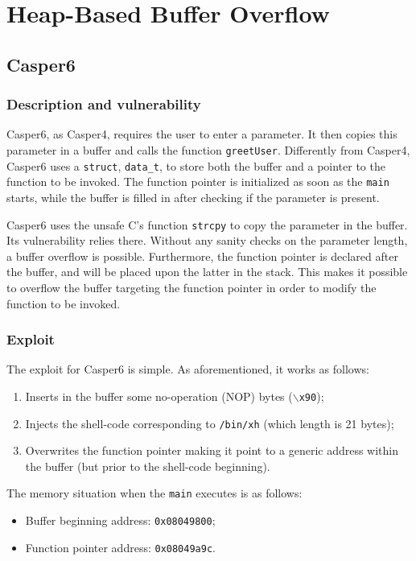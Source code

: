 \section{Heap-Based Buffer Overflow}
\subsection{Casper6}
\subsubsection{Description and vulnerability}
Casper6, as Casper4, requires the user to enter a parameter. It then copies this parameter in a buffer and calls the function \texttt{greetUser}. Differently from Casper4, Casper6 uses a \texttt{struct}, \texttt{data\_t}, to store both the buffer and a pointer to the function to be invoked. The function pointer is initialized as soon as the \texttt{main} starts, while the buffer is filled in after checking if the parameter is present. 

Casper6 uses the unsafe C's function \texttt{strcpy} to copy the parameter in the buffer. Its vulnerability relies there. Without any sanity checks on the parameter length, a buffer overflow is possible. Furthermore, the function pointer is declared after the buffer, and will be placed upon the latter in the stack. This makes it possible to overflow the buffer targeting the function pointer in order to modify the function to be invoked.

\subsubsection{Exploit}
The exploit for Casper6 is simple. As aforementioned, it works as follows:
\begin{enumerate}
	\item Inserts in the buffer some no-operation (NOP) bytes (\texttt{$\backslash$x90});
	\item Injects the shell-code corresponding to \texttt{/bin/xh} (which length is 21 bytes);
	\item Overwrites the function pointer making it point to a generic address within the buffer (but prior to the shell-code beginning).
\end{enumerate}

The memory situation when the \texttt{main} executes is as follows:
\begin{itemize}
	\item Buffer beginning address: \texttt{0x08049800};
	\item Function pointer address: \texttt{0x08049a9c}.
\end{itemize}

